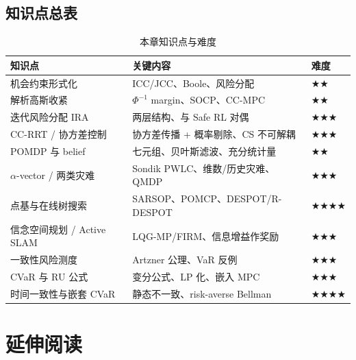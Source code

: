 \subsection*{知识点总表}
\begin{table}[H]\centering\small
\caption{本章知识点与难度}
\label{tab:plan-chance-points}
\begin{tabular}{lll}
\toprule
知识点 & 关键内容 & 难度 \\
\midrule
机会约束形式化 & ICC/JCC、Boole、风险分配 & $\bigstar\bigstar$ \\
解析高斯收紧 & $\Phi^{-1}$ margin、SOCP、CC-MPC & $\bigstar\bigstar$ \\
迭代风险分配 IRA & 两层结构、与 Safe RL 对偶 & $\bigstar\bigstar\bigstar$ \\
CC-RRT / 协方差控制 & 协方差传播 + 概率剔除、CS 不可解耦 & $\bigstar\bigstar\bigstar$ \\
POMDP 与 belief & 七元组、贝叶斯滤波、充分统计量 & $\bigstar\bigstar$ \\
$\alpha$-vector / 两类灾难 & Sondik PWLC、维数/历史灾难、QMDP & $\bigstar\bigstar\bigstar$ \\
点基与在线树搜索 & SARSOP、POMCP、DESPOT/R-DESPOT & $\bigstar\bigstar\bigstar\bigstar$ \\
信念空间规划 / Active SLAM & LQG-MP/FIRM、信息增益作奖励 & $\bigstar\bigstar\bigstar$ \\
一致性风险测度 & Artzner 公理、VaR 反例 & $\bigstar\bigstar\bigstar$ \\
CVaR 与 RU 公式 & 变分公式、LP 化、嵌入 MPC & $\bigstar\bigstar\bigstar$ \\
时间一致性与嵌套 CVaR & 静态不一致、risk-averse Bellman & $\bigstar\bigstar\bigstar\bigstar$ \\
\bottomrule
\end{tabular}
\end{table}

\section*{延伸阅读}
\label{sec:plan-chance-reading}

